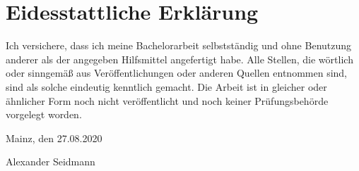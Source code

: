 \chapter*{Eidesstattliche Erkl\"{a}rung}
\thispagestyle{empty} Ich versichere, dass ich meine Bachelorarbeit
selbstständig und ohne Benutzung anderer als der angegeben
Hilfsmittel angefertigt habe. Alle Stellen, die wörtlich oder
sinngemäß aus Veröffentlichungen oder anderen Quellen entnommen
sind, sind als solche eindeutig kenntlich gemacht. Die Arbeit ist
in gleicher oder ähnlicher Form noch nicht veröffentlicht und noch
keiner Prüfungsbehörde vorgelegt worden.
\bigskip

\raggedright{Mainz, den 27.08.2020} \bigskip \bigskip \bigskip

Alexander Seidmann
